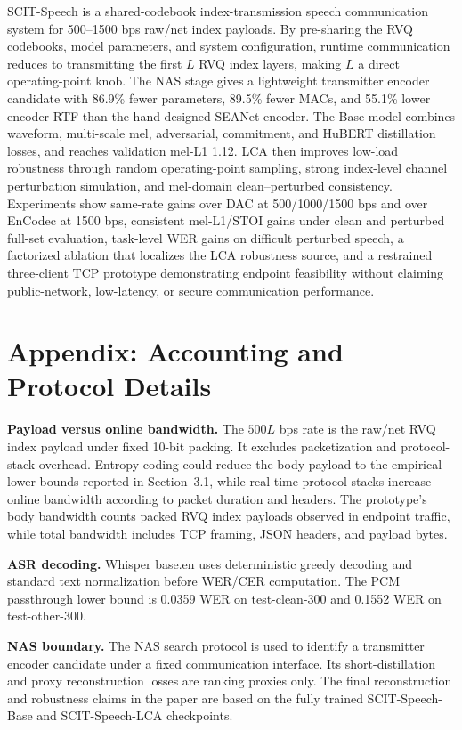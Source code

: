 \documentclass[10pt,twocolumn]{article}
\newcommand{\method}{SCIT-Speech}
\newcommand{\base}{SCIT-Speech-Base}
\newcommand{\lca}{SCIT-Speech-LCA}
\begin{document}
\method{} is a shared-codebook index-transmission speech communication system for 500--1500 bps raw/net index payloads. By pre-sharing the RVQ codebooks, model parameters, and system configuration, runtime communication reduces to transmitting the first \(L\) RVQ index layers, making \(L\) a direct operating-point knob. The NAS stage gives a lightweight transmitter encoder candidate with 86.9\% fewer parameters, 89.5\% fewer MACs, and 55.1\% lower encoder RTF than the hand-designed SEANet encoder. The Base model combines waveform, multi-scale mel, adversarial, commitment, and HuBERT distillation losses, and reaches validation mel-L1 1.12. LCA then improves low-load robustness through random operating-point sampling, strong index-level channel perturbation simulation, and mel-domain clean--perturbed consistency. Experiments show same-rate gains over DAC at 500/1000/1500 bps and over EnCodec at 1500 bps, consistent mel-L1/STOI gains under clean and perturbed full-set evaluation, task-level WER gains on difficult perturbed speech, a factorized ablation that localizes the LCA robustness source, and a restrained three-client TCP prototype demonstrating endpoint feasibility without claiming public-network, low-latency, or secure communication performance.

\balance



\appendix

\section{Appendix: Accounting and Protocol Details}

\textbf{Payload versus online bandwidth.}
The \(500L\) bps rate is the raw/net RVQ index payload under fixed 10-bit packing. It excludes packetization and protocol-stack overhead. Entropy coding could reduce the body payload to the empirical lower bounds reported in Section~3.1, while real-time protocol stacks increase online bandwidth according to packet duration and headers. The prototype's body bandwidth counts packed RVQ index payloads observed in endpoint traffic, while total bandwidth includes TCP framing, JSON headers, and payload bytes.

\textbf{ASR decoding.}
Whisper base.en uses deterministic greedy decoding and standard text normalization before WER/CER computation. The PCM passthrough lower bound is 0.0359 WER on test-clean-300 and 0.1552 WER on test-other-300.

\textbf{NAS boundary.}
The NAS search protocol is used to identify a transmitter encoder candidate under a fixed communication interface. Its short-distillation and proxy reconstruction losses are ranking proxies only. The final reconstruction and robustness claims in the paper are based on the fully trained \base{} and \lca{} checkpoints.
\end{document}
